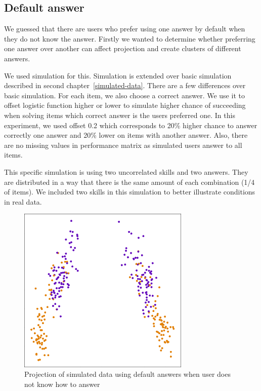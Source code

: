 \documentclass[
  print, %
  table,   %
  nolof,     %
  nolot,     %
  nocover,
  color,
  final,
]{fithesis3}
\begin{document}

\subsection{Default answer}\label{default-answer}

We guessed that there are users who prefer using one answer by default when they do not know the answer. Firstly we wanted to determine whether preferring one answer over another can affect projection and create clusters of different answers.

We used simulation for this. Simulation is extended over basic simulation described in second chapter~\ref{simulated-data}. There are a few differences over basic simulation. For each item, we also choose a correct answer. We use it to offset logistic function higher or lower to simulate higher chance of succeeding when solving items which correct answer is the users preferred one. In this experiment, we used offset 0.2 which corresponds to 20\% higher chance to answer correctly one answer and 20\% lower on items with another answer. Also, there are no missing values in performance matrix as simulated users answer to all items.

This specific simulation is using two uncorrelated skills and two answers. They are distributed in a way that there is the same amount of each combination (1/4 of items). We included two skills in this simulation to better illustrate conditions in real data.

\begin{figure}
  \includegraphics[height=8cm]{img/simulated_default}
  \caption{Projection of simulated data using default answers when user does not know how to answer}
  \label{fig:simulated_default}
\end{figure}
\end{document}
